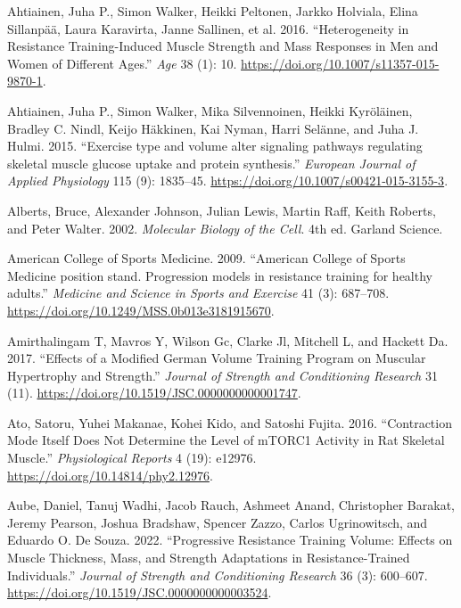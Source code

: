 \documentclass[
  letterpaper,
  DIV=11,
  numbers=noendperiod]{scrreprt}
\newlength{\cslhangindent}
\newlength{\cslentryspacingunit} %
\newenvironment{CSLReferences}[2] %
 {%
  \setlength{\parindent}{0pt}
  \ifodd #1
  \let\oldpar\par
  \def\par{\hangindent=\cslhangindent\oldpar}
  \fi
  \setlength{\parskip}{#2\cslentryspacingunit}
 }%
 {}
\begin{document}
\hypertarget{refs}{}
\begin{CSLReferences}{1}{0}
\leavevmode{}%
Ahtiainen, Juha P., Simon Walker, Heikki Peltonen, Jarkko Holviala,
Elina Sillanpää, Laura Karavirta, Janne Sallinen, et al. 2016.
{``Heterogeneity in Resistance Training-Induced Muscle Strength and Mass
Responses in Men and Women of Different Ages.''} \emph{Age} 38 (1): 10.
\url{https://doi.org/10.1007/s11357-015-9870-1}.

\leavevmode{}%
Ahtiainen, Juha P., Simon Walker, Mika Silvennoinen, Heikki Kyröläinen,
Bradley C. Nindl, Keijo Häkkinen, Kai Nyman, Harri Selänne, and Juha J.
Hulmi. 2015. {``Exercise type and volume alter signaling pathways
regulating skeletal muscle glucose uptake and protein synthesis.''}
\emph{European Journal of Applied Physiology} 115 (9): 1835--45.
\url{https://doi.org/10.1007/s00421-015-3155-3}.

\leavevmode{}%
Alberts, Bruce, Alexander Johnson, Julian Lewis, Martin Raff, Keith
Roberts, and Peter Walter. 2002. \emph{Molecular Biology of the Cell}.
4th ed. Garland Science.

\leavevmode{}%
American College of Sports Medicine. 2009. {``American College of Sports
Medicine position stand. Progression models in resistance training for
healthy adults.''} \emph{Medicine and Science in Sports and Exercise} 41
(3): 687--708. \url{https://doi.org/10.1249/MSS.0b013e3181915670}.

\leavevmode{}%
Amirthalingam T, Mavros Y, Wilson Gc, Clarke Jl, Mitchell L, and Hackett
Da. 2017. {``Effects of a Modified German Volume Training Program on
Muscular Hypertrophy and Strength.''} \emph{Journal of Strength and
Conditioning Research} 31 (11).
\url{https://doi.org/10.1519/JSC.0000000000001747}.

\leavevmode{}%
Ato, Satoru, Yuhei Makanae, Kohei Kido, and Satoshi Fujita. 2016.
{``Contraction Mode Itself Does Not Determine the Level of mTORC1
Activity in Rat Skeletal Muscle.''} \emph{Physiological Reports} 4 (19):
e12976. \url{https://doi.org/10.14814/phy2.12976}.

\leavevmode{}%
Aube, Daniel, Tanuj Wadhi, Jacob Rauch, Ashmeet Anand, Christopher
Barakat, Jeremy Pearson, Joshua Bradshaw, Spencer Zazzo, Carlos
Ugrinowitsch, and Eduardo O. De Souza. 2022. {``Progressive Resistance
Training Volume: Effects on Muscle Thickness, Mass, and Strength
Adaptations in Resistance-Trained Individuals.''} \emph{Journal of
Strength and Conditioning Research} 36 (3): 600--607.
\url{https://doi.org/10.1519/JSC.0000000000003524}.


\end{CSLReferences}
\end{document}
